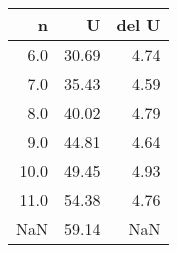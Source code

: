\begin{tabular}{rrr}
\toprule
   n &     U &  del U \\
\midrule
 6.0 & 30.69 &   4.74 \\
 7.0 & 35.43 &   4.59 \\
 8.0 & 40.02 &   4.79 \\
 9.0 & 44.81 &   4.64 \\
10.0 & 49.45 &   4.93 \\
11.0 & 54.38 &   4.76 \\
 NaN & 59.14 &    NaN \\
\bottomrule
\end{tabular}
